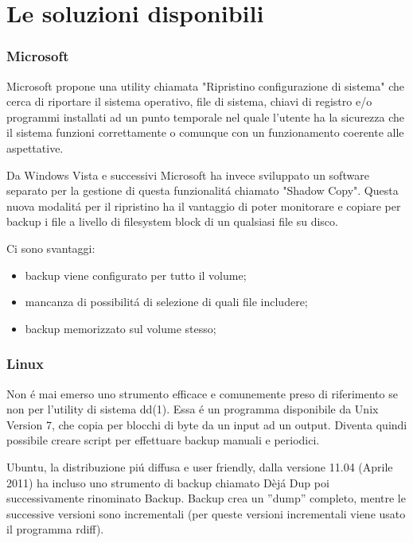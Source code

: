 \documentclass{beamer}
\begin{document}
\section{Le soluzioni disponibili}
\begin{frame}
\frametitle{Microsoft}
Microsoft propone una utility chiamata "Ripristino configurazione di sistema" che cerca di riportare il sistema operativo, file di sistema, chiavi di registro e/o programmi installati ad un punto temporale nel quale l'utente ha la sicurezza che il sistema funzioni correttamente o comunque con un funzionamento coerente alle aspettative.
\end{frame}

\begin{frame}
Da Windows Vista e successivi Microsoft ha invece sviluppato un software separato per la gestione di questa funzionalit\'a chiamato "Shadow Copy".
\newline
Questa nuova modalit\'a per il ripristino ha il vantaggio di poter monitorare e copiare per backup i file a livello di filesystem block di un qualsiasi file su disco.
\end{frame}

\begin{frame}
Ci sono svantaggi:
\begin{itemize}
\item backup viene configurato per tutto il volume;
\item mancanza di possibilit\'a di selezione di quali file includere;
\item backup memorizzato sul volume stesso;
\end{itemize}
\end{frame}

\begin{frame}
\frametitle{Linux}
Non \'e mai emerso uno strumento efficace e comunemente preso di riferimento se non per l’utility di sistema dd(1).
Essa \'e un programma disponibile da Unix Version 7, che copia per blocchi di byte da un input ad un output. Diventa quindi possibile creare script per effettuare backup manuali e periodici.
\end{frame}

\begin{frame}
Ubuntu, la distribuzione pi\'u diffusa e user friendly, dalla versione 11.04 (Aprile 2011) ha incluso uno strumento di backup chiamato D\`ej\'a Dup poi successivamente rinominato Backup.
\newline
Backup crea un ”dump” completo, mentre le successive versioni sono incrementali (per queste versioni incrementali viene usato il programma rdiff).
\end{frame}
\end{document}
